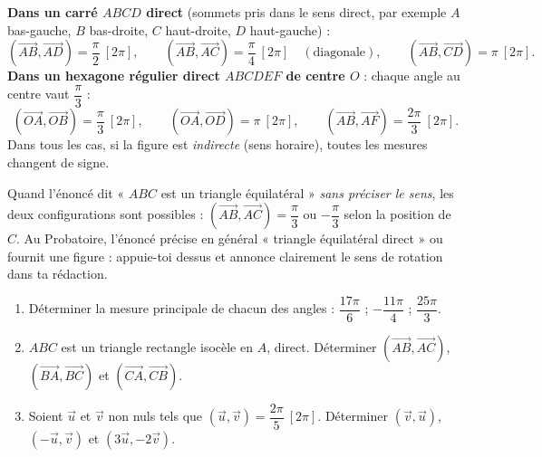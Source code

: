 \documentclass[11pt]{article}
\begin{document}
\begin{exemplebox}
\textbf{Dans un carré $ABCD$ direct} (sommets pris dans le sens direct, par exemple $A$ bas-gauche, $B$ bas-droite, $C$ haut-droite, $D$ haut-gauche) :
\[ (\overrightarrow{AB}, \overrightarrow{AD}) = \frac{\pi}{2} \ [2\pi], \qquad (\overrightarrow{AB}, \overrightarrow{AC}) = \frac{\pi}{4} \ [2\pi] \quad (\text{diagonale}), \qquad (\overrightarrow{AB}, \overrightarrow{CD}) = \pi \ [2\pi]. \]
\textbf{Dans un hexagone régulier direct $ABCDEF$ de centre $O$} : chaque angle au centre vaut $\dfrac{\pi}{3}$ :
\[ (\overrightarrow{OA}, \overrightarrow{OB}) = \frac{\pi}{3} \ [2\pi], \qquad (\overrightarrow{OA}, \overrightarrow{OD}) = \pi \ [2\pi], \qquad (\overrightarrow{AB}, \overrightarrow{AF}) = \frac{2\pi}{3} \ [2\pi]. \]
Dans tous les cas, si la figure est \emph{indirecte} (sens horaire), toutes les mesures changent de signe.
\end{exemplebox}

\begin{attention}
Quand l'énoncé dit « $ABC$ est un triangle équilatéral » \emph{sans préciser le sens}, les deux configurations sont possibles : $(\overrightarrow{AB}, \overrightarrow{AC}) = \dfrac{\pi}{3}$ ou $-\dfrac{\pi}{3}$ selon la position de $C$. Au Probatoire, l'énoncé précise en général « triangle équilatéral direct » ou fournit une figure : appuie-toi dessus et annonce clairement le sens de rotation dans ta rédaction.
\end{attention}

\begin{exercice}
\begin{enumerate}
  \item Déterminer la mesure principale de chacun des angles : $\dfrac{17\pi}{6}$ ; $-\dfrac{11\pi}{4}$ ; $\dfrac{25\pi}{3}$.
  \item $ABC$ est un triangle rectangle isocèle en $A$, direct. Déterminer $(\overrightarrow{AB}, \overrightarrow{AC})$, $(\overrightarrow{BA}, \overrightarrow{BC})$ et $(\overrightarrow{CA}, \overrightarrow{CB})$.
  \item Soient $\vec{u}$ et $\vec{v}$ non nuls tels que $(\vec{u}, \vec{v}) = \dfrac{2\pi}{5} \ [2\pi]$. Déterminer $(\vec{v}, \vec{u})$, $(-\vec{u}, \vec{v})$ et $(3\vec{u}, -2\vec{v})$.
\end{enumerate}
\end{exercice}
\end{document}
